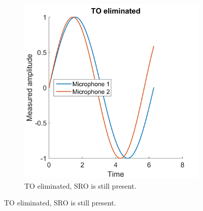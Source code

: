 \documentclass[a4paper, notitlepage]{report}
\begin{document}
\begin{figure}[hbt]
\begin{adjustwidth}{-1in}{-1in}
\begin{subfigure}{0.25\paperwidth}
		\includegraphics[width=\textwidth]{figures/sro-example/only-sro}
		\caption{TO eliminated, SRO is still present.}
		\label{fig:sync-ex2}
	\end{subfigure}
	

\end{adjustwidth}
\end{figure}
\end{document}
